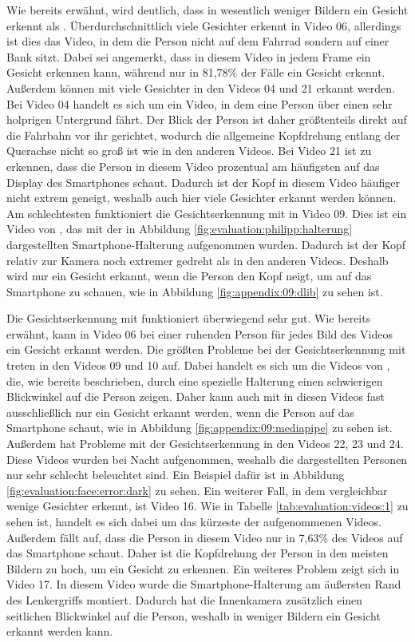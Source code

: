Wie bereits erwähnt, wird deutlich, dass \dlib in wesentlich weniger Bildern ein Gesicht erkennt als \mediapipe. Überdurchschnittlich viele Gesichter erkennt \dlib in Video 06, allerdings ist dies das Video, in dem die Person nicht auf dem Fahrrad sondern auf einer Bank sitzt. Dabei sei angemerkt, dass \mediapipe in diesem Video in jedem Frame ein Gesicht erkennen kann, während \dlib nur in 81,78\% der Fälle ein Gesicht erkennt. Außerdem können mit \dlib viele Gesichter in den Videos 04 und 21 erkannt werden. Bei Video 04 handelt es sich um ein Video, in dem eine Person über einen sehr holprigen Untergrund fährt. Der Blick der Person ist daher größtenteils direkt auf die Fahrbahn vor ihr gerichtet, wodurch die allgemeine Kopfdrehung entlang der Querachse nicht so groß ist wie in den anderen Videos. Bei Video 21 ist zu erkennen, dass die Person in diesem Video prozentual am häufigsten auf das Display des Smartphones schaut. Dadurch ist der Kopf in diesem Video häufiger nicht extrem geneigt, weshalb auch hier viele Gesichter erkannt werden können. Am schlechtesten funktioniert die Gesichtserkennung mit \dlib in Video 09. Dies ist ein Video von \philipp, das mit der in Abbildung \ref{fig:evaluation:philipp:halterung} dargestellten Smartphone-Halterung aufgenommen wurden. Dadurch ist der Kopf relativ zur Kamera noch extremer gedreht als in den anderen Videos. Deshalb wird nur ein Gesicht erkannt, wenn die Person den Kopf neigt, um auf das Smartphone zu schauen, wie in Abbildung \ref{fig:appendix:09:dlib} zu sehen ist.

Die Gesichtserkennung mit \mediapipe funktioniert überwiegend sehr gut. Wie bereits erwähnt, kann in Video 06 bei einer ruhenden Person für jedes Bild des Videos ein Gesicht erkannt werden. Die größten Probleme bei der Gesichtserkennung mit \mediapipe treten in den Videos 09 und 10 auf. Dabei handelt es sich um die Videos von \philipp, die, wie bereits beschrieben, durch eine spezielle Halterung einen schwierigen Blickwinkel auf die Person zeigen. Daher kann auch mit \mediapipe in diesen Videos fast ausschließlich nur ein Gesicht erkannt werden, wenn die Person auf das Smartphone schaut, wie in Abbildung \ref{fig:appendix:09:mediapipe} zu sehen ist. Außerdem hat \mediapipe Probleme mit der Gesichtserkennung in den Videos 22, 23 und 24. Diese Videos wurden bei Nacht aufgenommen, weshalb die dargestellten Personen nur sehr schlecht beleuchtet sind. Ein Beispiel dafür ist in Abbildung \ref{fig:evaluation:face:error:dark} zu sehen. Ein weiterer Fall, in dem \mediapipe vergleichbar wenige Gesichter erkennt, ist Video 16. Wie in Tabelle \ref{tab:evaluation:videos:1} zu sehen ist, handelt es sich dabei um das kürzeste der aufgenommenen Videos. Außerdem fällt auf, dass die Person in diesem Video nur in 7,63\% des Videos auf das Smartphone schaut. Daher ist die Kopfdrehung der Person in den meisten Bildern zu hoch, um ein Gesicht zu erkennen. Ein weiteres Problem zeigt sich in Video 17. In diesem Video wurde die Smartphone-Halterung am äußersten Rand des Lenkergriffs montiert. Dadurch hat die Innenkamera zusätzlich einen seitlichen Blickwinkel auf die Person, weshalb in weniger Bildern ein Gesicht erkannt werden kann.

